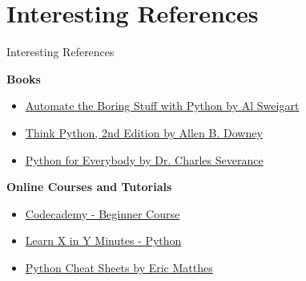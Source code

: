 \documentclass[
	11pt, 
]{beamer}
\begin{document}
\section{Interesting References}
\begin{frame}[fragile]{Interesting References}
\begin{exampleblock}{\textbf{Books}}
    
\begin{itemize}


\item \href{https://automatetheboringstuff.com/}{Automate the Boring Stuff with Python by Al Sweigart}

\item \href{http://greenteapress.com/thinkpython2/thinkpython2.pdf}{Think Python, 2nd Edition by Allen B. Downey}

\item \href{https://www.py4e.com/book.php}{Python for Everybody by Dr. Charles Severance}

\end{itemize}
\end{exampleblock}

\begin{exampleblock}{\textbf{Online Courses and Tutorials}}

\begin{itemize}

\item \href{https://www.codecademy.com/learn/learn-python-3}{Codecademy - Beginner Course}

\item \href{https://learnxinyminutes.com/docs/python/}{Learn X in Y Minutes - Python}

\item \href{https://ehmatthes.github.io/pcc_2e/cheat_sheets/cheat_sheets/}{Python Cheat Sheets by Eric Matthes}
\end{itemize}
\end{exampleblock}
\end{frame}





\end{document}
